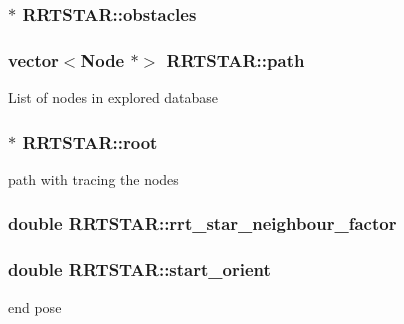 \subsubsection[{\texorpdfstring{obstacles}{obstacles}}]{$\ast$ R\+R\+T\+S\+T\+A\+R\+::obstacles}\hypertarget{classRRTSTAR_a3d9f67d4f4efa9681148b683e7b2455c}{}\label{classRRTSTAR_a3d9f67d4f4efa9681148b683e7b2455c}
\subsubsection[{\texorpdfstring{path}{path}}]{\setlength{\rightskip}{0pt plus 5cm}vector$<${\bf Node} $\ast$$>$ R\+R\+T\+S\+T\+A\+R\+::path}\hypertarget{classRRTSTAR_a3c4afcfe867e23c36e268aedd488e062}{}\label{classRRTSTAR_a3c4afcfe867e23c36e268aedd488e062}
List of nodes in explored database 
\subsubsection[{\texorpdfstring{root}{root}}]{$\ast$ R\+R\+T\+S\+T\+A\+R\+::root}\hypertarget{classRRTSTAR_a93a4dad750b6a408269ca45a4b618d4e}{}\label{classRRTSTAR_a93a4dad750b6a408269ca45a4b618d4e}
path with tracing the nodes 
\subsubsection[{\texorpdfstring{rrt\+\_\+star\+\_\+neighbour\+\_\+factor}{rrt_star_neighbour_factor}}]{\setlength{\rightskip}{0pt plus 5cm}double R\+R\+T\+S\+T\+A\+R\+::rrt\+\_\+star\+\_\+neighbour\+\_\+factor}\hypertarget{classRRTSTAR_acb06c8a7193ad7776cf155a10142c5c3}{}\label{classRRTSTAR_acb06c8a7193ad7776cf155a10142c5c3}
\subsubsection[{\texorpdfstring{start\+\_\+orient}{start_orient}}]{\setlength{\rightskip}{0pt plus 5cm}double R\+R\+T\+S\+T\+A\+R\+::start\+\_\+orient}\hypertarget{classRRTSTAR_a571433cf52df263c3e866c317e0ac4e3}{}\label{classRRTSTAR_a571433cf52df263c3e866c317e0ac4e3}
end pose 
